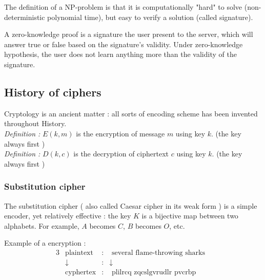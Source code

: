 The definition of a NP-problem is that it is computationally "hard" to solve (non-deterministic polynomial time), but easy to verify a solution (called signature).

A zero-knowledge proof is a signature the user present to the server, which will answer true or false based on the signature's validity. Under zero-knowledge hypothesis, the user does not learn anything more than the validity of the signature.

\subsection{History of ciphers}

Cryptology is an ancient matter : all sorts of encoding scheme has been invented throughout History. \\


\emph{Definition :} $E(k,m)$ is the encryption of message $m$ using key $k$. (the key always first ) \\
\emph{Definition :} $D(k,c)$ is the decryption of ciphertext $c$ using key $k$. (the key always first ) 

\subsubsection{Substitution cipher }
The substitution cipher ( also called Caesar cipher in its weak form ) is a simple encoder, yet relatively effective : the key $K$ is a bijective map between two alphabets. For example, $A$ becomes $C$, $B$ becomes $O$, etc.\\

\begin{table}[ht!]
    \centering
	\caption{Substitution table}
	\label{tab:SubstitionTable}
\end{table}

Example of a encryption : 
\begin{alignat*}{3}
    &\text{plaintext}   & : & \text{ several flame-throwing sharks}&  \\
    & \downarrow        & : &   \downarrow & \\
    &\text{cyphertex}   & : & \text{ plilrcq   zqcslgvrudlr pvcrbp}&  \\ 
\end{alignat*}


